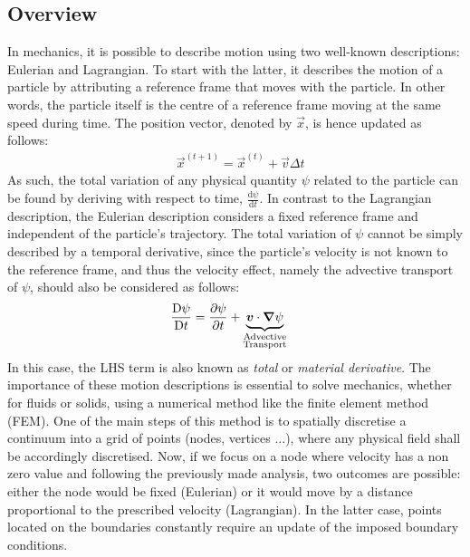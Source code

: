 \subsection{Overview}
In mechanics, it is possible to describe motion using two well-known descriptions: Eulerian and Lagrangian.
To start with the latter, it describes the motion of a particle by attributing a reference frame that moves with the particle.
In other words, the particle itself is the centre of a reference frame moving at the same speed during time. 
The position vector, denoted by $\vec{x}$, is hence updated as follows:
\begin{align}
\label{eq:lagrangian}
& \vec{x}^{(t+1)}  = \vec{x}^{(t)} + \vec{v} \Delta t
\end{align}
As such, the total variation of any physical quantity $\psi$ related to the particle 
can be found by deriving with respect to time, $\frac{\mathrm{d} \psi}{\mathrm{d} t}$.
%
In contrast to the Lagrangian description, the Eulerian description considers a 
fixed reference frame and independent of the particle's trajectory. The total variation of $\psi$
cannot be simply described by a temporal derivative, since the particle's velocity is not known to 
the reference frame, and thus the velocity effect, namely the advective transport of $\psi$, should also be considered as follows:
\begin{align}
\label{eq:eulerian}
& \frac{\mathrm{D} \psi}{\mathrm{D} t} = \frac{\partial \psi}{\partial t} 
   + \underbrace{\boldsymbol{v} \cdot \boldsymbol{\nabla} \psi}_{\substack{\text{Advective} \\ \text{Transport}}}  
\end{align}
In this case, the LHS term is also known as \emph{total} or \emph{material derivative}.
The importance of these motion descriptions is essential to solve mechanics, whether for 
fluids or solids, using a numerical method like the finite element method (FEM). One of 
the main steps of this method is to spatially discretise a continuum into a grid of points 
(nodes, vertices ...), where any physical field shall be accordingly discretised. Now, if 
we focus on a node where velocity has a non zero value and following the previously made 
analysis, two outcomes are possible: either the node would be fixed (Eulerian) or it would 
move by a distance proportional to the prescribed velocity (Lagrangian). In the latter case,
points located on the boundaries constantly require an update of the imposed boundary conditions.

